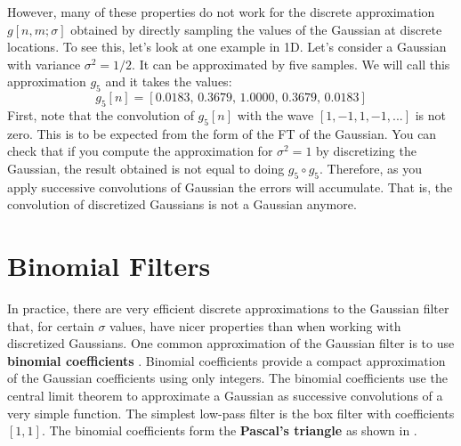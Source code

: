 However, many of these properties do not work for the discrete approximation $g\left[n,m;\sigma \right]$ obtained by directly sampling the values of the Gaussian at discrete locations. To see this, let's look at one example in 1D. Let's consider a Gaussian with variance $\sigma^2=1/2$. It can be approximated by five samples. We will call this approximation $g_5$ and it takes the values:
\begin{equation}
g_5\left[ n \right] = \left[0.0183, \,    0.3679, \,    1.0000, \,    0.3679, \,    0.0183 \right] 
\end{equation}
First, note that the convolution of $g_5\left[ n \right]$ with the wave $\left[1,-1,1,-1,...\right]$ is not zero. This is to be expected from the form of the FT of the Gaussian. You can check that if you compute the approximation for $\sigma^2=1$ by discretizing the Gaussian, the result obtained is not equal to doing $g_5 \circ g_5$. Therefore, as you apply successive convolutions of Gaussian the errors will accumulate. That is, the convolution of discretized Gaussians is not a Gaussian anymore. 

\section{Binomial Filters}

In practice, there are very efficient discrete approximations to the Gaussian filter that, for certain $\sigma$ values, have nicer properties than when working with discretized Gaussians. One common approximation of the Gaussian filter is to use {\bf binomial coefficients} \cite{Chehikian91}. Binomial coefficients provide a compact approximation of the Gaussian coefficients using only integers. The binomial coefficients use the central limit theorem to approximate a Gaussian as successive convolutions of a very simple function. The simplest low-pass filter is the box filter with coefficients $\left[1,1\right]$. The binomial coefficients form the {\bf Pascal's triangle} as shown in \fig{\ref{fig:pascaltriangle}}.

